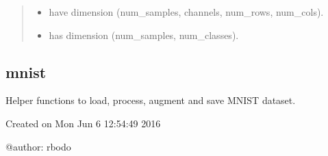\documentclass[letterpaper,10pt,english]{sphinxmanual}
\begin{document}
\begin{fulllineitems}
\begin{quote}
\begin{description}
\begin{itemize}
\item {} 
 have dimension (num\_samples, channels, num\_rows, num\_cols).

\item {} 
 has dimension (num\_samples, num\_classes).

\end{itemize}


\end{description}\end{quote}

\end{fulllineitems}



\subsection{mnist}
\label{snntoolbox.io_utils:mnist}\label{snntoolbox.io_utils:module-snntoolbox.io_utils.mnist_load}
Helper functions to load, process, augment and save MNIST dataset.

Created on Mon Jun  6 12:54:49 2016

@author: rbodo
\end{document}
